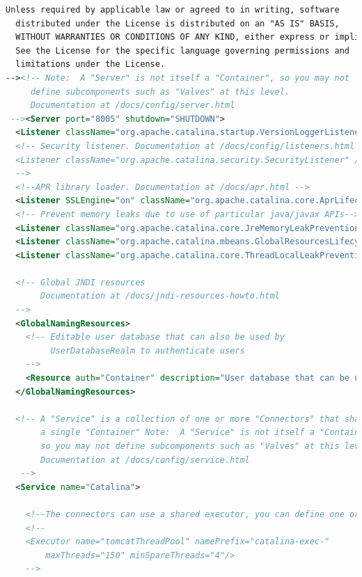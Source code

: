 \documentclass[a4paper,oneside, 11pt]{article}
\begin{document}
\begin{enumerate}
\begin{lstlisting}[language=XML]
  Unless required by applicable law or agreed to in writing, software
  distributed under the License is distributed on an "AS IS" BASIS,
  WITHOUT WARRANTIES OR CONDITIONS OF ANY KIND, either express or implied.
  See the License for the specific language governing permissions and
  limitations under the License.
--><!-- Note:  A "Server" is not itself a "Container", so you may not
     define subcomponents such as "Valves" at this level.
     Documentation at /docs/config/server.html
 --><Server port="8005" shutdown="SHUTDOWN">
  <Listener className="org.apache.catalina.startup.VersionLoggerListener"/>
  <!-- Security listener. Documentation at /docs/config/listeners.html
  <Listener className="org.apache.catalina.security.SecurityListener" />
  -->
  <!--APR library loader. Documentation at /docs/apr.html -->
  <Listener SSLEngine="on" className="org.apache.catalina.core.AprLifecycleListener"/>
  <!-- Prevent memory leaks due to use of particular java/javax APIs-->
  <Listener className="org.apache.catalina.core.JreMemoryLeakPreventionListener"/>
  <Listener className="org.apache.catalina.mbeans.GlobalResourcesLifecycleListener"/>
  <Listener className="org.apache.catalina.core.ThreadLocalLeakPreventionListener"/>

  <!-- Global JNDI resources
       Documentation at /docs/jndi-resources-howto.html
  -->
  <GlobalNamingResources>
    <!-- Editable user database that can also be used by
         UserDatabaseRealm to authenticate users
    -->
    <Resource auth="Container" description="User database that can be updated and saved" factory="org.apache.catalina.users.MemoryUserDatabaseFactory" name="UserDatabase" pathname="conf/tomcat-users.xml" type="org.apache.catalina.UserDatabase"/>
  </GlobalNamingResources>

  <!-- A "Service" is a collection of one or more "Connectors" that share
       a single "Container" Note:  A "Service" is not itself a "Container",
       so you may not define subcomponents such as "Valves" at this level.
       Documentation at /docs/config/service.html
   -->
  <Service name="Catalina">

    <!--The connectors can use a shared executor, you can define one or more named thread pools-->
    <!--
    <Executor name="tomcatThreadPool" namePrefix="catalina-exec-"
        maxThreads="150" minSpareThreads="4"/>
    -->



\end{lstlisting}
\end{enumerate}
\end{document}
